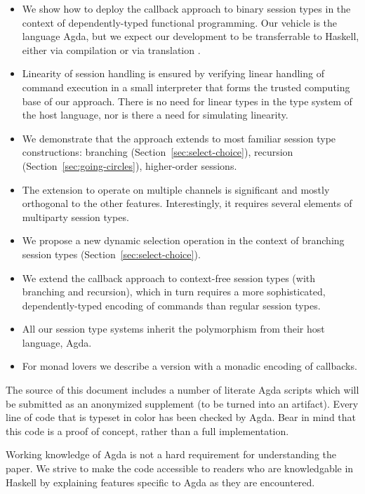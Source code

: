 \documentclass[acmsmall,screen,anonymous,review]{acmart}
\begin{document}
\begin{itemize}
\item We show how to deploy the callback approach to binary session
  types in the context of dependently-typed functional
  programming. Our vehicle is the language Agda, but we expect our
  development to be transferrable to Haskell, either via compilation or via translation
  \cite{DBLP:conf/haskell/CockxME0N22}.
\item Linearity of session handling is ensured by verifying linear
  handling of command execution in a small interpreter that forms the
  trusted computing base of our approach. There is no need for linear
  types in the type system of the host language, nor is there a need
  for simulating linearity.
\item We demonstrate that the approach extends to most familiar
  session type constructions: branching
  (Section~\ref{sec:select-choice}), recursion
  (Section~\ref{sec:going-circles}), higher-order sessions.
\item The extension to operate on multiple channels is significant and
  mostly orthogonal to the other features. Interestingly, it requires
  several elements of multiparty session types.
\item We propose a new dynamic selection operation in the context of
  branching session types (Section~\ref{sec:select-choice}).
\item We extend the callback approach to context-free session types
  (with branching and recursion), which in turn requires a more
  sophisticated, dependently-typed encoding of commands than regular
  session types.
\item All our session type systems inherit the polymorphism from their
  host language, Agda.
\item For monad lovers we describe a version with a monadic encoding of callbacks.
\end{itemize}

The source of this document includes a number of literate Agda
scripts which will be submitted as an anonymized supplement (to be
turned into an artifact). Every line of code that is typeset in color
has been checked by Agda. Bear in mind that this code is a proof of
concept, rather than a full implementation.


Working knowledge of Agda is not a hard requirement for understanding the
paper. We strive to make the code accessible to readers who are
knowledgable in Haskell by explaining features specific
to Agda as they are encountered.
\end{document}
